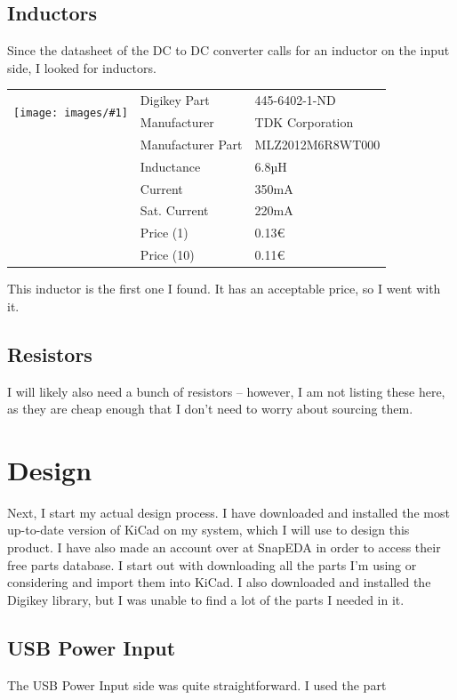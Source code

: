 \documentclass[a4paper]{article}
\makeatletter
\newenvironment{partdisplay}[1]{
\begin{center}
\begin{tabular}{@{}p{3cm}p{3cm}p{4.5cm}@{}}
\multirow{2}{3cm}{\texttt{[image: images/\#1]}}}{
\end{tabular}
\end{center}}
\makeatother
\begin{document}
\subsection{Inductors}

Since the datasheet of the DC to DC converter calls for an inductor on the input side, I looked for inductors. 

\begin{partdisplay}{MFG_MLZ2012}
& Digikey Part & 445-6402-1-ND\\
& Manufacturer & TDK Corporation\\
& Manufacturer Part & MLZ2012M6R8WT000\\
& Inductance & 6.8µH\\
& Current & 350mA\\
& Sat. Current & 220mA\\
& Price (1) & 0.13€\\
& Price (10) & 0.11€\\
\end{partdisplay}

This inductor is the first one I found. It has an acceptable price, so I went with it.

\subsection{Resistors}

I will likely also need a bunch of resistors -- however, I am not listing these here, as they are cheap enough that I don't need to worry about sourcing them.

\section{Design}

Next, I start my actual design process. I have downloaded and installed the most up-to-date version of KiCad on my system, which I will use to design this product. I have also made an account over at SnapEDA in order to access their free parts database. I start out with downloading all the parts I'm using or considering and import them into KiCad. I also downloaded and installed the Digikey library, but I was unable to find a lot of the parts I needed in it.

\subsection{USB Power Input}

The USB Power Input side was quite straightforward. I used the part
\end{document}
